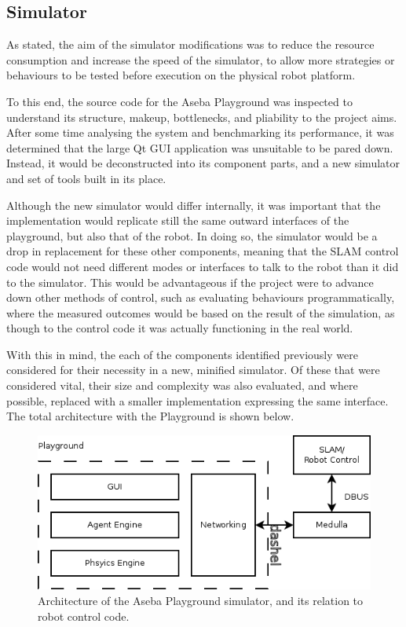 \subsection{Simulator}
As stated, the aim of the simulator modifications was to reduce the resource
consumption and increase the speed of the simulator, to allow more strategies
or behaviours to be tested before execution on the physical robot platform.

To this end, the source code for the Aseba Playground was inspected to
understand its structure, makeup, bottlenecks, and pliability to the project
aims. After some time analysing the system and benchmarking its performance,
it was determined that the large Qt GUI application was unsuitable to be pared
down. Instead, it would be deconstructed into its component parts, and a new
simulator and set of tools built in its place.

Although the new simulator would differ internally, it was important that the
implementation would replicate still the same outward interfaces of the
playground, but also that of the robot. In doing so, the simulator would be a
drop in replacement for these other components, meaning that the SLAM control
code would not need different modes or interfaces to talk to the robot than it
did to the simulator. This would be advantageous if the project were to advance
down other methods of control, such as evaluating behaviours programmatically,
where the measured outcomes would be based on the result of the simulation, as
though to the control code it was actually functioning in the real world.

With this in mind, the each of the components identified previously were
considered for their necessity in a new, minified simulator. Of these that were
considered vital, their size and complexity was also evaluated, and where
possible, replaced with a smaller implementation expressing the same interface.
The total architecture with the Playground is shown below.
\begin{figure}[!h]
    \centering
    \includegraphics[width=\textwidth]{playground.png}
    \caption{Architecture of the Aseba Playground simulator, and its relation
    to robot control code.}
\end{figure}

